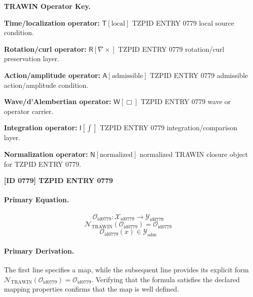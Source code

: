 \par\vspace{0.45\baselineskip}
\noindent\begin{minipage}[t]{\linewidth}
\begingroup
\small
\raggedright
\textbf{TRAWIN Operator Key.}\par
\noindent\textbf{Time/localization operator:} $\mathsf{T}\!\left[\mathrm{local}\right]$ TZPID ENTRY 0779 local source condition.\par
\noindent\textbf{Rotation/curl operator:} $\mathsf{R}\!\left[\nabla\times\right]$ TZPID ENTRY 0779 rotation/curl preservation layer.\par
\noindent\textbf{Action/amplitude operator:} $\mathsf{A}\!\left[\mathrm{admissible}\right]$ TZPID ENTRY 0779 admissible action/amplitude condition.\par
\noindent\textbf{Wave/d'Alembertian operator:} $\mathsf{W}\!\left[\Box\right]$ TZPID ENTRY 0779 wave or operator carrier.\par
\noindent\textbf{Integration operator:} $\mathsf{I}\!\left[\int\right]$ TZPID ENTRY 0779 integration/comparison layer.\par
\noindent\textbf{Normalization operator:} $\mathsf{N}\!\left[\mathrm{normalized}\right]$ normalized TRAWIN closure object for TZPID ENTRY 0779.\par
\endgroup
\end{minipage}

\clearpage
\noindent\textbf{[ID 0779] TZPID ENTRY 0779}\par
\vspace{0.35em}
\paragraph{Primary Equation.}
\[
\mathcal{O}_{\mathrm{id0779}}:\mathcal{X}_{\mathrm{id0779}}\longrightarrow\mathcal{Y}_{\mathrm{id0779}}
\]
\[
\mathcal{N}_{\mathrm{TRAWIN}}(\mathcal{O}_{\mathrm{id0779}})=\mathcal{O}_{\mathrm{id0779}}
\]
\[
\mathcal{O}_{\mathrm{id0779}}(x)\in\mathcal{Y}_{\mathrm{adm}}
\]

\paragraph{Primary Derivation.}
The first line specifies a map, while the subsequent line provides its explicit form \( \mathcal{N}_{\mathrm{TRAWIN}}(\mathcal{O}_{\mathrm{id0779}})=\mathcal{O}_{\mathrm{id0779}} \). Verifying that the formula satisfies the declared mapping properties confirms that the map is well defined.
